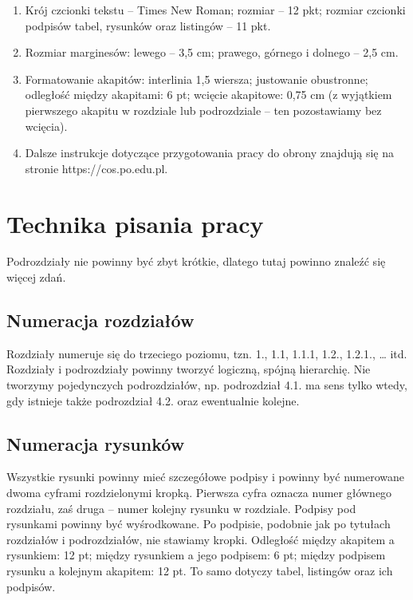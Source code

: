 \begin{enumerate}
  \item Krój czcionki tekstu – Times New Roman; rozmiar – 12 pkt; rozmiar czcionki podpisów tabel, rysunków oraz listingów – 11 pkt.
  \item Rozmiar marginesów: lewego – 3,5 cm; prawego, górnego i dolnego – 2,5 cm.
  \item Formatowanie akapitów: interlinia 1,5 wiersza; justowanie obustronne; odległość między akapitami: 6 pt; wcięcie akapitowe: 0,75 cm (z wyjątkiem pierwszego akapitu w rozdziale lub podrozdziale – ten pozostawiamy bez wcięcia).
  \item Dalsze instrukcje dotyczące przygotowania pracy do obrony znajdują się na stronie https://cos.po.edu.pl.
\end{enumerate}

\section{Technika pisania pracy}

Podrozdziały nie powinny być zbyt krótkie, dlatego tutaj powinno znaleźć się więcej zdań.

\subsection{Numeracja rozdziałów}

Rozdziały numeruje się do trzeciego poziomu, tzn. 1., 1.1, 1.1.1, 1.2., 1.2.1., … itd. Rozdziały i podrozdziały powinny tworzyć logiczną, spójną hierarchię. Nie tworzymy pojedynczych podrozdziałów, np. podrozdział 4.1. ma sens tylko wtedy, gdy istnieje także podrozdział 4.2. oraz ewentualnie kolejne.

\subsection{Numeracja rysunków}

Wszystkie rysunki powinny mieć szczegółowe podpisy i powinny być numerowane dwoma cyframi rozdzielonymi kropką. Pierwsza cyfra oznacza numer głównego rozdziału, zaś druga – numer kolejny rysunku w rozdziale. Podpisy pod rysunkami powinny być wyśrodkowane. Po podpisie, podobnie jak po tytułach rozdziałów i podrozdziałów, nie stawiamy kropki. Odległość między akapitem a rysunkiem: 12 pt; między rysunkiem a jego podpisem: 6 pt; między podpisem rysunku a kolejnym akapitem: 12 pt. To samo dotyczy tabel, listingów oraz ich podpisów.

